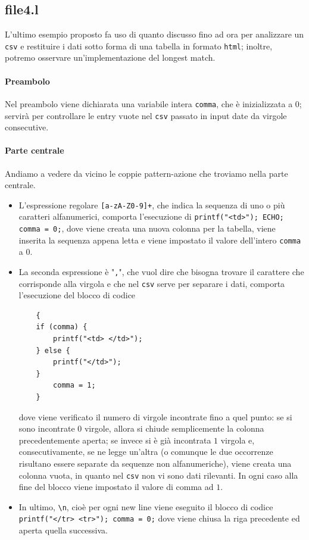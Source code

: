 \documentclass[class=book, crop=false, oneside, 12pt]{standalone}
\begin{document}
\subsection*{file4.l} 
\noindent L'ultimo esempio proposto fa uso di quanto discusso fino ad ora per analizzare un \texttt{csv} e restituire i dati sotto forma di una tabella in formato \texttt{html}; inoltre, potremo osservare un'implementazione del longest match.

\paragraph{Preambolo}
Nel preambolo viene dichiarata una variabile intera \texttt{comma}, che è inizializzata a \(0\); servirà per controllare le entry vuote nel \texttt{csv} passato in input date da virgole consecutive.

\paragraph{Parte centrale}
Andiamo a vedere da vicino le coppie pattern-azione che troviamo nella parte centrale.
\begin{itemize}
    \item L'espressione regolare \texttt{[a-zA-Z0-9]+}, che indica la sequenza di uno o più caratteri alfanumerici, comporta l'esecuzione di \texttt{printf("<td>"); ECHO; comma = 0;}, dove viene creata una nuova colonna per la tabella, viene inserita la sequenza appena letta e viene impostato il valore dell'intero \texttt{comma} a \(0\).
    \item La seconda espressione è "\texttt{,}", che vuol dire che bisogna trovare il carattere che corrisponde alla virgola e che nel \texttt{csv} serve per separare i dati, comporta l'esecuzione del blocco di codice
    \begin{verbatim}
    {            
    if (comma) {
        printf("<td> </td>"); 
    } else { 
        printf("</td>");
    }       
        comma = 1;
    }
    \end{verbatim}
        
    dove viene verificato il numero di virgole incontrate fino a quel punto: se si sono incontrate 0 virgole, allora si chiude semplicemente la colonna precedentemente aperta; se invece si è già incontrata \(1\) virgola e, consecutivamente, se ne legge un'altra (o comunque le due occorrenze risultano essere separate da sequenze non alfanumeriche), viene creata una colonna vuota, in quanto nel \texttt{csv} non vi sono dati rilevanti. In ogni caso alla fine del blocco viene impostato il valore di comma ad \(1\).
    \item In ultimo, \texttt{\textbackslash n}, cioè per ogni new line viene eseguito il blocco di codice \texttt{{printf("</tr> \n <tr>"); comma = 0;}} dove viene chiusa la riga precedente ed aperta quella successiva.
\end{itemize}
\end{document}

